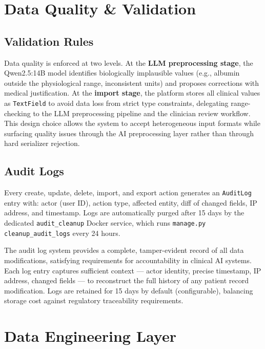 \documentclass[12pt,a4paper,twoside]{report}
\begin{document}
\section{Data Quality \& Validation}\label{sec:quality}

\subsection{Validation Rules}

Data quality is enforced at two levels. At the \textbf{LLM preprocessing stage}, the Qwen2.5:14B model identifies biologically implausible values (e.g., albumin outside the physiological range, inconsistent units) and proposes corrections with medical justification. At the \textbf{import stage}, the platform stores all clinical values as \texttt{TextField} to avoid data loss from strict type constraints, delegating range-checking to the LLM preprocessing pipeline and the clinician review workflow. This design choice allows the system to accept heterogeneous input formats while surfacing quality issues through the AI preprocessing layer rather than through hard serializer rejection.

\subsection{Audit Logs}

Every create, update, delete, import, and export action generates an \texttt{AuditLog} entry with: actor (user ID), action type, affected entity, diff of changed fields, IP address, and timestamp. Logs are automatically purged after 15 days by the dedicated \texttt{audit\_cleanup} Docker service, which runs \texttt{manage.py cleanup\_audit\_logs} every 24 hours.

The audit log system provides a complete, tamper-evident record of all data modifications, satisfying requirements for accountability in clinical AI systems. Each log entry captures sufficient context — actor identity, precise timestamp, IP address, changed fields — to reconstruct the full history of any patient record modification. Logs are retained for 15 days by default (configurable), balancing storage cost against regulatory traceability requirements.

\section{Data Engineering Layer}\label{sec:data_engineering}
\end{document}
